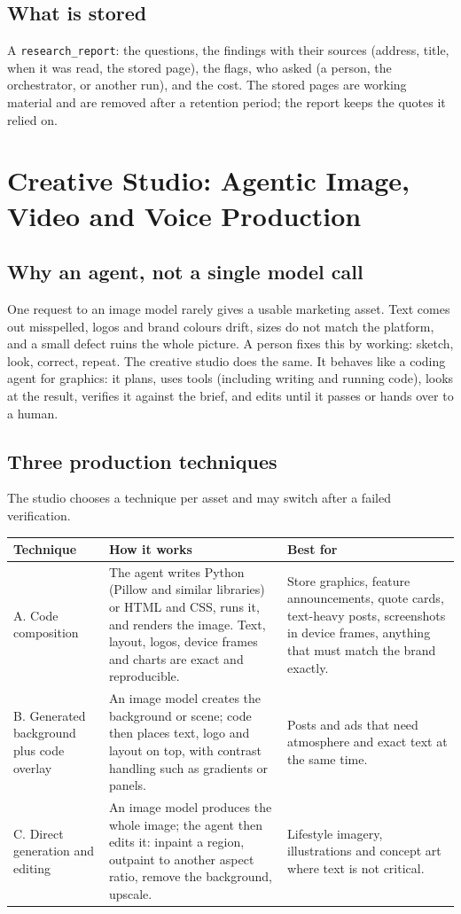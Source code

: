 \documentclass[11pt,a4paper]{article}
\begin{document}
\subsection{What is stored}
A \texttt{research\_report}: the questions, the findings with their sources (address, title, when it was read, the stored page), the flags, who asked (a person, the orchestrator, or another run), and the cost. The stored pages are working material and are removed after a retention period; the report keeps the quotes it relied on.

\section{Creative Studio: Agentic Image, Video and Voice Production}\label{sec:studio}

\subsection{Why an agent, not a single model call}
One request to an image model rarely gives a usable marketing asset. Text comes out misspelled, logos and brand colours drift, sizes do not match the platform, and a small defect ruins the whole picture. A person fixes this by working: sketch, look, correct, repeat. The creative studio does the same. It behaves like a coding agent for graphics: it plans, uses tools (including writing and running code), looks at the result, verifies it against the brief, and edits until it passes or hands over to a human.

\subsection{Three production techniques}
The studio chooses a technique per asset and may switch after a failed verification.

\begin{longtable}{@{}p{3.6cm}p{5.8cm}p{5.9cm}@{}}
\toprule
\textbf{Technique} & \textbf{How it works} & \textbf{Best for}\\
\midrule
\endhead
A. Code composition & The agent writes Python (Pillow and similar libraries) or HTML and CSS, runs it, and renders the image. Text, layout, logos, device frames and charts are exact and reproducible. & Store graphics, feature announcements, quote cards, text-heavy posts, screenshots in device frames, anything that must match the brand exactly.\\
B. Generated background plus code overlay & An image model creates the background or scene; code then places text, logo and layout on top, with contrast handling such as gradients or panels. & Posts and ads that need atmosphere and exact text at the same time.\\
C. Direct generation and editing & An image model produces the whole image; the agent then edits it: inpaint a region, outpaint to another aspect ratio, remove the background, upscale. & Lifestyle imagery, illustrations and concept art where text is not critical.\\
\bottomrule
\end{longtable}
\end{document}
